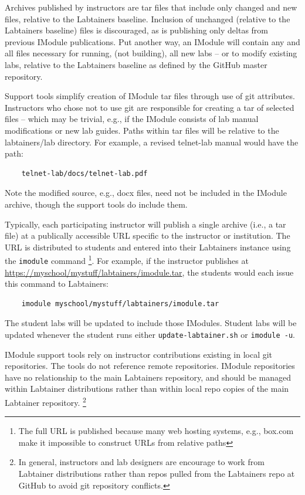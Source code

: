 \documentclass[12pt]{article}
\begin{document}
Archives published by instructors are tar files that include only changed and new files,
relative to the Labtainers baseline.  Inclusion of unchanged (relative to the 
Labtainers baseline) files is discouraged, as is publishing only deltas from previous
IModule publications.  Put another way, an IModule will contain any 
and all files
necessary for running, (not building), all new labs -- or to modify existing labs, 
relative to the Labtainers baseline as defined by the GitHub master repository.

Support tools simplify creation of IModule tar files through use of git attributes.
Instructors who chose not to use git are responsible for creating a tar of selected
files -- which may be trivial, e.g., if the IModule consists of lab manual modifications
or new lab guides.  Paths within tar files will be relative to the labtainers/lab
directory.  For example, a revised telnet-lab manual would have the path:
\begin{verbatim}
    telnet-lab/docs/telnet-lab.pdf
\end{verbatim}
\noindent Note the modified source, e.g., docx files, need not be included in the IModule
archive, though the support tools do include them.

Typically, each participating instructor will publish a single archive (i.e., a tar file)
at a publically accessible URL specific to the instructor or institution. The URL 
is distributed to students and entered into their Labtainers 
instance using the {\tt imodule} command \footnote{The full URL is published because many
web hosting systems, e.g., box.com make it impossible to construct URLs from relative paths}.  
For example, if the instructor publishes
at \url{https://myschool/mystuff/labtainers/imodule.tar}, the students would each issue
this command to Labtainers:
\begin{verbatim}
    imodule myschool/mystuff/labtainers/imodule.tar
\end{verbatim} 

The student labs will be updated to include those IModules.  Student labs
will be updated whenever the student runs either {\tt update-labtainer.sh} or {\tt imodule -u}.

IModule support tools rely on instructor contributions existing in local git repositories.
The tools do not reference remote repositories.  IModule repositories have no relationship
to the main Labtainers repository, and should be managed within Labtainer
distributions rather than within local repo copies of the main Labtainer repository.   \footnote{In general,
instructors and lab designers are encourage to work from Labtainer distributions rather
than repos pulled from the Labtainers repo at GitHub to avoid git repository conflicts.}
\end{document}
